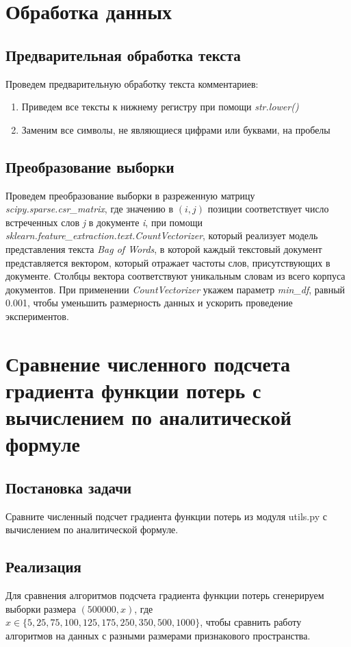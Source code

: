 \documentclass[14pt]{extarticle}
\begin{document}
\section{Обработка данных}

\subsection{Предварительная обработка текста}

Проведем предварительную обработку текста комментариев:
\begin{enumerate}
    \item Приведем все тексты к нижнему регистру при помощи \textit{str.lower()}
    \item Заменим все символы, не являющиеся цифрами или буквами, на пробелы
\end{enumerate}

\subsection{Преобразование выборки}

Проведем преобразование выборки в разреженную матрицу \textit{scipy.sparse.csr\_matrix}, где значению в \textit{\((i, j)\)} позиции соответствует число встреченных слов \textit{j} в документе \textit{i}, при помощи \textit{sklearn.feature\_extraction.text.CountVectorizer}, который реализует модель представления текста \textit{Bag of Words}, в которой каждый текстовый документ представляется вектором, который отражает частоты слов, присутствующих в документе. Столбцы вектора соответствуют уникальным словам из всего корпуса документов. При применении \textit{CountVectorizer} укажем параметр \textit{min\_df}, равный 0.001, чтобы уменьшить размерность данных и ускорить проведение экспериментов.

\section{Сравнение численного подсчета градиента функции потерь с вычислением по аналитической формуле}

\subsection{Постановка задачи}

Сравните численный подсчет градиента функции потерь из модуля utils.py с вычислением по аналитической формуле.

\subsection{Реализация}
Для сравнения алгоритмов подсчета градиента функции потерь сгенерируем выборки размера \textit{\((500000, x)\)}, где \textit{\( x \in \{5, 25, 75, 100, 125, 175, 250, 350, 500, 1000\} \)}, чтобы сравнить работу алгоритмов на данных с разными размерами признакового пространства.
\end{document}

